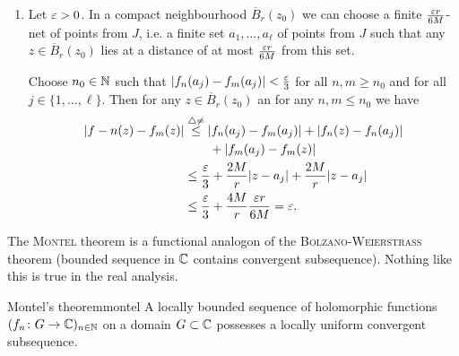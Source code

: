 \documentclass[a4paper,english]{article}
\begin{document}
\begin{pr}
\begin{enumerate}
        \item
        Let $\varepsilon > 0$.
        In a compact neighbourhood $\overline{B}_r(z_0)$ we can choose a finite $\frac{\varepsilon r}{6 M}$-net of points from $J$, i.e. a finite set $a_1, \ldots, a_{\ell}$ of points from $J$ such that any $z \in \overline{B}_r(z_0)$ lies at a distance of at most $\frac{\varepsilon r}{6 M}$ from this set.
        
        Choose $n_0 \in \operatorname{\mathbb{N}}$ such that $| f_n(a_j) - f_m(a_j) | < \frac{\varepsilon}{3}$ for all $n, m \ge n_0$ and for all $j \in \{ 1, \ldots, \ell\}$.
        Then for any $z \in \overline{B}_r(z_0)$ an for any $n, m \le n_0$ we have
        \begin{align*}
            | f-n(z) - f_m(z) |
            & \overset{\triangle \ne}{\le} | f_n(a_j) - f_m(a_j) | + | f_n(z) - f_n(a_j) | \\
            & \qquad + | f_m(a_j) - f_m(z) | \\
            & \le \frac{\varepsilon}{3} + \frac{2 M}{r} | z - a_j | + \frac{2 M}{r} | z - a_j | \\
            & \le \frac{\varepsilon}{3} + \frac{4 M}{r} \frac{\varepsilon r}{6 M}
            = \varepsilon.
        \end{align*}
    \end{enumerate}
\end{pr}

The \textsc{Montel} theorem is a functional analogon of the \textsc{Bolzano}-\textsc{Weierstrass} theorem (bounded sequence in $\operatorname{\mathbb{C}}$ contains convergent subsequence).
Nothing like this is true in the real analysis.

\begin{thm}{Montel's theorem}{montel}
    A locally bounded sequence of holomorphic functions $(f_n \colon G \to \operatorname{\mathbb{C}})_{n \in \operatorname{\mathbb{N}}}$ on a domain $G \subset \operatorname{\mathbb{C}}$ possesses a locally uniform convergent subsequence.
\end{thm}
\end{document}
